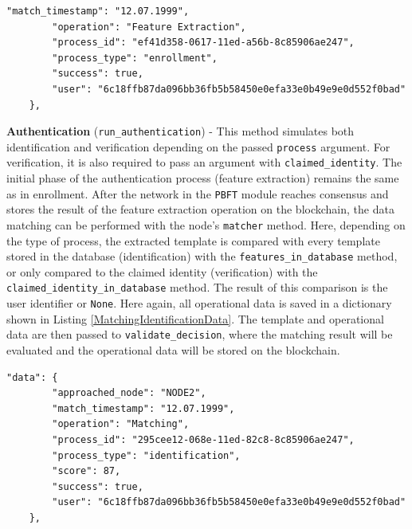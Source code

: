 \begin{description}
\begin{lstlisting}[frame=single,breaklines=true, caption={Transaction data of feature extraction in enrollment.},captionpos=b, label={FeatureExtractionEnrollmentData}]
        "match_timestamp": "12.07.1999",
        "operation": "Feature Extraction",
        "process_id": "ef41d358-0617-11ed-a56b-8c85906ae247",
        "process_type": "enrollment",
        "success": true,
        "user": "6c18ffb87da096bb36fb5b58450e0efa33e0b49e9e0d552f0bad"
    },
    \end{lstlisting}
    \item \textbf{Authentication} (\texttt{run\_authentication}) - This method simulates both identification and verification depending on the passed \texttt{process} argument. For verification, it is also required to pass an argument with \texttt{claimed\_identity}. The initial phase of the authentication process (feature extraction) remains the same as in enrollment. After the network in the \texttt{PBFT} module reaches consensus and stores the result of the feature extraction operation on the blockchain, the data matching can be performed with the node's \texttt{matcher} method. Here, depending on the type of process, the extracted template is compared with every template stored in the database (identification) with the \texttt{features\_in\_database} method, or only compared to the claimed identity (verification) with the \texttt{claimed\_identity\_in\_database} method. The result of this comparison is the user identifier or \texttt{None}. Here again, all operational data is saved in a dictionary shown in Listing \ref{MatchingIdentificationData}. The template and operational data are then passed to \texttt{validate\_decision}, where the matching result will be evaluated and the operational data will be stored on the blockchain.
    \newpage
    \begin{lstlisting}[frame=single,breaklines=true, caption={Transaction data of feature extraction in enrollment.},captionpos=b, label={MatchingIdentificationData}]
    "data": {
        "approached_node": "NODE2",
        "match_timestamp": "12.07.1999",
        "operation": "Matching",
        "process_id": "295cee12-068e-11ed-82c8-8c85906ae247",
        "process_type": "identification",
        "score": 87,
        "success": true,
        "user": "6c18ffb87da096bb36fb5b58450e0efa33e0b49e9e0d552f0bad"
    },
    \end{lstlisting}
\end{description}
